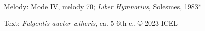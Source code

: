 




\begin{hymnsource}
Melody: Mode IV, melody 70; \emph{Liber Hymnarius}, Solesmes, 1983*

Text: \emph{Fulgentis auctor ætheris}, ca. 5-6th c., © 2023 ICEL
\end{hymnsource}
